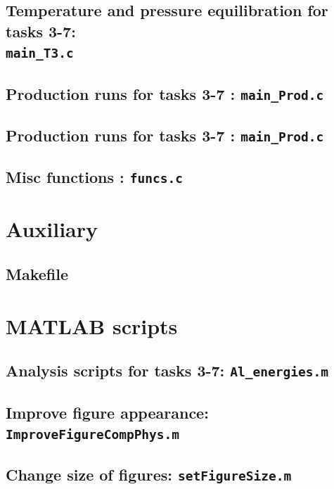 \subsection{Temperature and pressure equilibration for tasks 3-7:\\ \texttt{main\_T3.c}}


\subsection{Production runs for tasks 3-7 : \texttt{main\_Prod.c}}


\subsection{Production runs for tasks 3-7 : \texttt{main\_Prod.c}}



\subsection{Misc functions : \texttt{funcs.c}}


\section{Auxiliary }
\subsection{Makefile}




\section{MATLAB scripts}
\subsection{Analysis scripts for tasks 3-7: \texttt{Al\_energies.m}}


\subsection{Improve figure appearance: \texttt{ImproveFigureCompPhys.m}}


\subsection{Change size of figures: \texttt{setFigureSize.m}}




